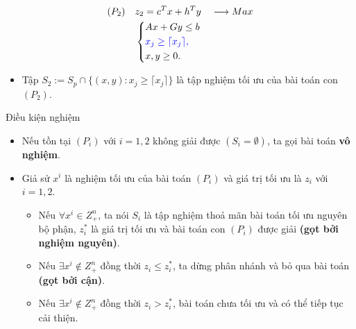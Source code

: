 \documentclass[12pt,a4paper]{report}
\begin{document}
\begin{equation}
    \begin{split}
    (P_2) \quad & z_2=c^Tx+h^Ty \quad \longrightarrow Max \\
                & \left\{\begin{split}
                    &Ax+Gy \leq  b \\
                    &\color{blue} x_j \geq \lceil x_j \rceil , \\
                    &x,y \geq 0.
                \end{split}\right.    
    \end{split}
\end{equation}
\begin{itemize}
\item Tập $S_2:=S_p \cap \{ (x,y): x_j \geq \lceil x_j \rceil \}$ là tập nghiệm tối ưu của bài toán con $(P_2)$.
\end{itemize}


{Điều kiện nghiệm}
\begin{itemize}
\item Nếu tồn tại $(P_i)$ với $i=1,2$ không giải được $(S_i = \emptyset )$, ta gọi bài toán \textbf{vô nghiệm}.
\item Giả sử $x^i$ là nghiệm tối ưu của bài toán $(P_i)$ và giá trị tối ưu là $z_i$ với $i = 1,2$.
\begin{itemize}
\item Nếu $\forall x^i \in Z^n_+$, ta nói $S_i$ là tập nghiệm thoả mãn bài toán tối ưu nguyên bộ phận, $z^*_i$ là giá trị tối ưu và bài toán con $(P_i)$ được giải \textbf{(gọt bởi nghiệm nguyên)}.
\item Nếu $\exists x^i \notin Z^n_+$ đồng thời $z_i \leq z^*_i$, ta dừng phân nhánh và bỏ qua bài toán \textbf{(gọt bởi cận)}.
\item Nếu $\exists x^i \notin Z^n_+$ đồng thời $z_i > z^*_i$, bài toán chưa tối ưu và có thể tiếp tục cải thiện.

\end{itemize}
\end{itemize}
\end{document}
